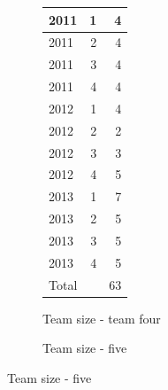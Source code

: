\documentclass[UKenglish]{ifimaster}  %
\begin{document}
\begin{figure}[h]
\begin{subfigure}[b]{0.2\textwidth}
{\begin{tabular}{ | l | r | r | }
	2011 & 1 & 4 \\ \hline
	2011 & 2 & 4 \\ \hline
	2011 & 3 & 4 \\ \hline
	2011 & 4 & 4 \\ \hline
	2012 & 1 & 4 \\ \hline
	2012 & 2 & 2 \\ \hline
	2012 & 3 & 3 \\ \hline
	2012 & 4 & 5 \\ \hline
	2013 & 1 & 7 \\ \hline
	2013 & 2 & 5 \\ \hline
	2013 & 3 & 5 \\ \hline
	2013 & 4 & 5 \\ \hline
	Total & &63  \\ \hline
\end{tabular}
}
\caption{Team size - team four}
 \label{Team:4}
\end{subfigure}
\begin{subfigure}[b]{0.1\textwidth}
\center
\caption{Team size - five}
 \label{Team:5}
\end{subfigure}


\end{figure}
\end{document}
